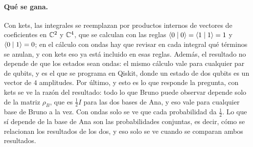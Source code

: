 \paragraph{Qué se gana.} Con kets, las integrales se reemplazan por productos internos de vectores de coeficientes en $\mathbb{C}^2$ y $\mathbb{C}^4$, que se calculan con las reglas $\langle 0\mid 0\rangle=\langle 1\mid 1\rangle=1$ y $\langle 0\mid 1\rangle=0$; en el cálculo con ondas hay que revisar en cada integral qué términos se anulan, y con kets eso ya está incluido en esas reglas. Además, el resultado no depende de que los estados sean ondas: el mismo cálculo vale para cualquier par de qubits, y es el que se programa en Qiskit, donde un estado de dos qubits es un vector de $4$ amplitudes. Por último, y esto es lo que responde la pregunta, con kets se ve la razón del resultado: todo lo que Bruno puede observar depende solo de la matriz $\rho_B$, que es $\frac12 I$ para las dos bases de Ana, y eso vale para cualquier base de Bruno a la vez. Con ondas solo se ve que cada probabilidad da $\frac12$. Lo que sí depende de la base de Ana son las probabilidades conjuntas, es decir, cómo se relacionan los resultados de los dos, y eso solo se ve cuando se comparan ambos resultados.

